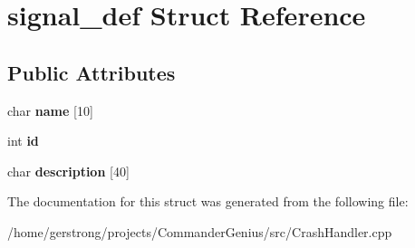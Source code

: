 \hypertarget{structsignal__def}{
\section{signal\_\-def Struct Reference}
\label{structsignal__def}
}
\subsection*{Public Attributes}
\begin{DoxyCompactItemize}
\item 
\hypertarget{structsignal__def_a18b036efd7629180f22ab91fc058c600}{
char {\bfseries name} \mbox{[}10\mbox{]}}
\label{structsignal__def_a18b036efd7629180f22ab91fc058c600}

\item 
\hypertarget{structsignal__def_adff159dcd0b71a353f507d09b0981f1b}{
int {\bfseries id}}
\label{structsignal__def_adff159dcd0b71a353f507d09b0981f1b}

\item 
\hypertarget{structsignal__def_af207ba29e7896e051a847ba8d349d668}{
char {\bfseries description} \mbox{[}40\mbox{]}}
\label{structsignal__def_af207ba29e7896e051a847ba8d349d668}

\end{DoxyCompactItemize}


The documentation for this struct was generated from the following file:\begin{DoxyCompactItemize}
\item 
/home/gerstrong/projects/CommanderGenius/src/CrashHandler.cpp\end{DoxyCompactItemize}
